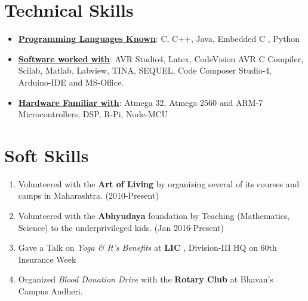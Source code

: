\documentclass[10pt,a4paper,sans]{moderncv} %
\begin{document}


\section{Technical Skills}

\begin{itemize}
\item\textbf{\underline{Programming Languages Known}}: C, C++, Java, Embedded C , Python \newline

\item \textbf{\underline{Software worked with}}:  AVR Studio4, Latex, CodeVision AVR C Compiler, Scilab, Matlab, Labview, TINA, SEQUEL, Code Composer Studio-4, Arduino-IDE and MS-Office.  \newline

\item \textbf{\underline{Hardware Familiar with}}: Atmega 32, Atmega 2560 and ARM-7 Microcontrollers, DSP, R-Pi, Node-MCU

\end {itemize}




\section{Soft Skills}
\begin{enumerate}
\item Volunteered with the\textbf{ Art of Living} by organizing several of its courses and camps in Maharashtra.        (2010-Present) 
\item Volunteered with the \textbf{Abhyudaya} foundation by Teaching (Mathematics, Science) to the underprivileged kids. (Jan 2016-Present) 
\item Gave a Talk on \textit{Yoga \& It's Benefits} at \textbf{LIC }, Division-III HQ on 60th Insurance Week 
\item Organized \textit{Blood Donation Drive} with the \textbf{Rotary Club} at Bhavan's Campus Andheri.
\end{enumerate}

\end{document}
